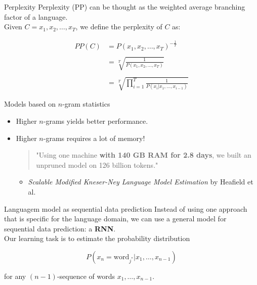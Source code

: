 \documentclass[10pt]{beamer}
\begin{document}
\begin{frame}{Perplexity}
\alert{Perplexity (PP)} can be thought as the weighted average branching factor of a language.\\


Given $C= x_1, x_2, \dots, x_T$, we define the perplexity of $C$ as:

\begin{align*}
PP(C) &= P(x_1, x_2, \dots, x_T)^{-\frac{1}{T}}\\
    & \\
      &= \sqrt[T]{\frac{1}{P(x_1, x_2, \dots, x_T)}}\\
      & \\
      &= \sqrt[T]{\prod_{i=1}^{T}\frac{1}{P(x_i \vert x_1,\dots, x_{i-1})}}
\end{align*}
\end{frame}

\begin{frame}{Models based on $n$-gram statistics}
\begin{itemize}
\item Higher $n$-grams yields better performance.
\vspace{0.7cm}
\item Higher $n$-grams requires a lot of memory!
\vspace{0.1cm}
\begin{quote}
"Using one machine \textbf{with 140 GB
RAM for 2.8 days}, we built an unpruned
model on 126 billion tokens."
\end{quote}
\begin{itemize}
\item [] \textit{Scalable Modified Kneser-Ney Language Model Estimation} by Heafield et al.
\end{itemize}
\end{itemize}
\end{frame}



\begin{frame}{Languagem model as sequential data prediction}
Instead of using one approach that is specific for the language domain, we can use a general model for sequential data prediction: a \textbf{RNN}. \\

Our learning task is to estimate the probability distribution 

\[
P(x_{n} = \text{word}_{j^{*}} | x_{1}, \dots ,x_{n-1})
\]

for any $(n-1)$-sequence of words $x_{1}, \dots ,x_{n-1}$.
\end{frame}
\end{document}

